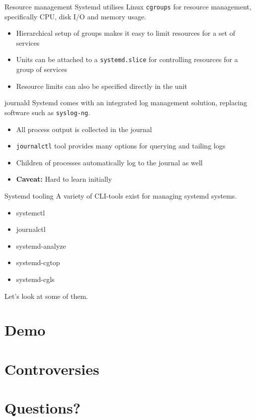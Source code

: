 \documentclass[14pt]{beamer}
\newenvironment{code}{\ttfamily}{\par}
\begin{document}
\begin{frame}{Resource management}
  Systemd utilises Linux \texttt{cgroups} for resource management, specifically CPU, disk I/O and memory usage.

  \begin{itemize}
  \item Hierarchical setup of groups makes it easy to limit resources for a set of services
  \item Units can be attached to a \texttt{systemd.slice} for controlling resources for a group of services
  \item Resource limits can also be specified directly in the unit
  \end{itemize}
\end{frame}

\begin{frame}{journald}
  Systemd comes with an integrated log management solution, replacing software such as \texttt{syslog-ng}.
  \begin{itemize}
  \item All process output is collected in the journal
  \item \texttt{journalctl} tool provides many options for querying and tailing logs
  \item Children of processes automatically log to the journal as well
  \item \textbf{Caveat:} Hard to learn initially
  \end{itemize}
\end{frame}

\begin{frame}{Systemd tooling}
  A variety of CLI-tools exist for managing systemd systems.
  \begin{code}
    \begin{itemize}
    \item systemctl
    \item journalctl
    \item systemd-analyze
    \item systemd-cgtop
    \item systemd-cgls
    \end{itemize}
  \end{code}

  Let's look at some of them.
\end{frame}

\section{Demo}

\section{Controversies}

\section{Questions?}
\end{document}
